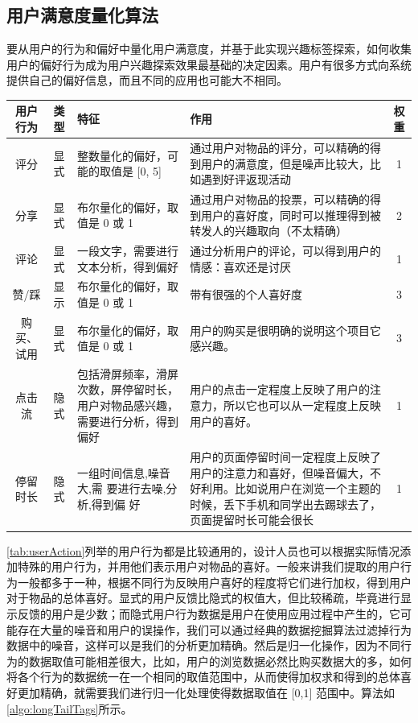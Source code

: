   \subsection{用户满意度量化算法}
  要从用户的行为和偏好中量化用户满意度，并基于此实现兴趣标签探索，如何收集用户的偏好行为成为用户兴趣探索效果最基础的决定因素。用户有很多方式向系统提供自己的偏好信息，而且不同的应用也可能大不相同。
    \begin{table}[htp]
    \centering
    \label{tab:userAction}
    \begin{tabular}{ |c|c|p{4cm}|p{5cm}|c|} \hline
     用户行为 & 类型 & 特征 & 作用 & 权重\\ \hline
     评分 & 显式 & 整数量化的偏好，可能的取值是 [0, 5] & 通过用户对物品的评分，可以精确的得到用户的满意度，但是噪声比较大，比如遇到好评返现活动 & 1\\ \hline
     分享 & 显式 & 布尔量化的偏好，取值是 0 或 1 & 通过用户对物品的投票，可以精确的得到用户的喜好度，同时可以推理得到被转发人的兴趣取向（不太精确）& 2\\ \hline
     评论 & 显式 & 一段文字，需要进行文本分析，得到偏好 & 通过分析用户的评论，可以得到用户的情感：喜欢还是讨厌 & 1\\ \hline
     赞/踩 & 显示 & 布尔量化的偏好，取值是 0 或 1 & 带有很强的个人喜好度 & 3 \\ \hline
     购买、试用 & 显式 & 布尔量化的偏好，取值是 0 或 1 & 用户的购买是很明确的说明这个项目它感兴趣。& 3 \\ \hline
     点击流 & 隐式 & 包括滑屏频率，滑屏次数，屏停留时长，用户对物品感兴趣，需要进行分析，得到偏好 & 用户的点击一定程度上反映了用户的注意力，所以它也可以从一定程度上反映用户的喜好。& 1 \\ \hline
     停留时长 & 隐式 & 一组时间信息,噪音大,需 要进行去噪,分析,得到偏 好 & 用户的页面停留时间一定程度上反映了用户的注意力和喜好，但噪音偏大，不好利用。比如说用户在浏览一个主题的时候，丢下手机和同学出去踢球去了，页面提留时长可能会很长 & 1 \\ \hline
    \end{tabular}
    \end{table}
  \autoref{tab:userAction}列举的用户行为都是比较通用的，设计人员也可以根据实际情况添加特殊的用户行为，并用他们表示用户对物品的喜好。一般来讲我们提取的用户行为一般都多于一种，根据不同行为反映用户喜好的程度将它们进行加权，得到用户对于物品的总体喜好。显式的用户反馈比隐式的权值大，但比较稀疏，毕竟进行显示反馈的用户是少数；而隐式用户行为数据是用户在使用应用过程中产生的，它可能存在大量的噪音和用户的误操作，我们可以通过经典的数据挖掘算法过滤掉行为数据中的噪音，这样可以是我们的分析更加精确。然后是归一化操作，因为不同行为的数据取值可能相差很大，比如，用户的浏览数据必然比购买数据大的多，如何将各个行为的数据统一在一个相同的取值范围中，从而使得加权求和得到的总体喜好更加精确，就需要我们进行归一化处理使得数据取值在 [0,1] 范围中。算法如\autoref{algo:longTailTags}所示。

